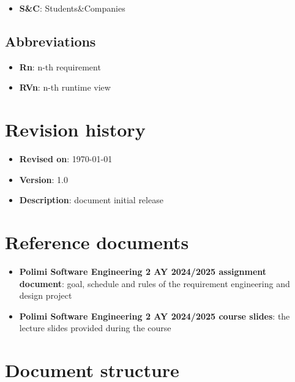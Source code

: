 \begin{itemize}
    \item \textbf{S\&C}: Students\&Companies
\end{itemize}

\subsection{Abbreviations}

\begin{itemize}
    \item \textbf{Rn}: n-th requirement
    \item \textbf{RVn}: n-th runtime view
\end{itemize}

\section{Revision history}

\begin{itemize}
    \item \textbf{Revised on}: \today
    \item \textbf{Version}: 1.0
    \item \textbf{Description}: document initial release
\end{itemize}

\section{Reference documents}

\begin{itemize}
    \item \textbf{Polimi Software Engineering 2 AY 2024/2025 assignment document}: goal, schedule and rules of the requirement engineering and design project
    \item \textbf{Polimi Software Engineering 2 AY 2024/2025 course slides}: the lecture slides provided during the course
\end{itemize}

\section{Document structure}

